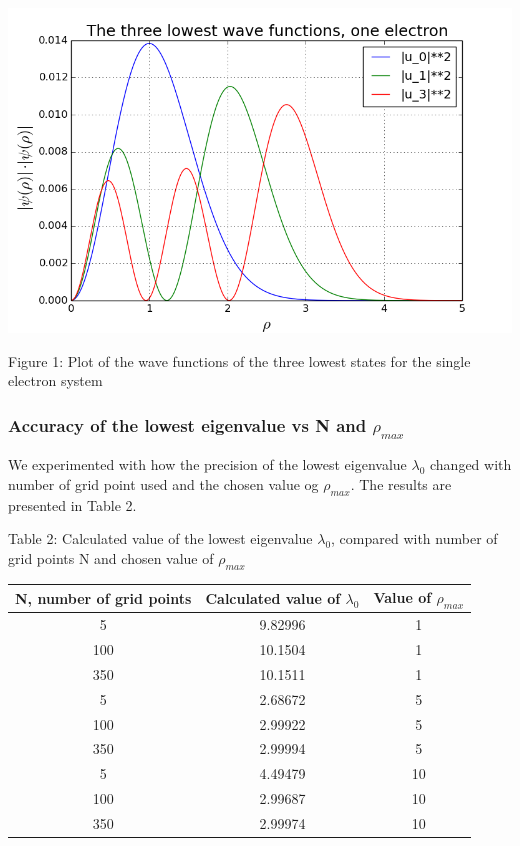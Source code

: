 \documentclass[norsk,a4paper,12pt]{article}
\begin{document}
\includegraphics[scale=0.6]{wavefunc_one}\par
Figure 1: Plot of the wave functions of the three lowest states for the single electron system
\par
\vspace{5mm}

\subsubsection{Accuracy of the lowest eigenvalue vs N and $\rho_{max}$}\par
\vspace{3mm}
We experimented with how the precision of the lowest eigenvalue $\lambda_0$ changed with number of grid point used and the chosen value og $\rho_{max}$. The results are presented in Table 2.
\par
\vspace{3mm}


Table 2: Calculated value of the lowest eigenvalue $\lambda_0$, compared with number of grid points N and chosen value of $\rho_{max}$
\par
\vspace{2mm}

\begin{tabular}{|c|c|c|}\hline
     {\bf N, number of grid points} & {\bf Calculated value of $\lambda_0$ } & {\bf Value of $\rho_{max}$} \\ \hline
     5 & 9.82996 & 1\\
     100 & 10.1504 & 1\\
     350 & 10.1511 & 1\\ \hline
     5 & 2.68672 & 5\\
     100 & 2.99922 & 5\\
     350 & 2.99994 & 5\\ \hline
     5 &  4.49479 & 10\\
     100 & 2.99687  & 10\\
     350 & 2.99974 & 10 \\ \hline
  
\end{tabular}\par
\par
\vspace{3mm}
\end{document}

